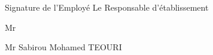 \documentclass[a4paper, 12pt]{article}
\begin{document}
Signature de l'Employé \hspace{5.3cm}  Le Responsable d'établissement
\vspace{1cm}


\begin{minipage}[t]{0.5\textwidth} %
\raggedright %
Mr     
\end{minipage} %
\hfill %
\begin{minipage}[t]{0.4\textwidth} %
\raggedleft %
Mr Sabirou Mohamed TEOURI

\end{minipage} %



\end{document}
